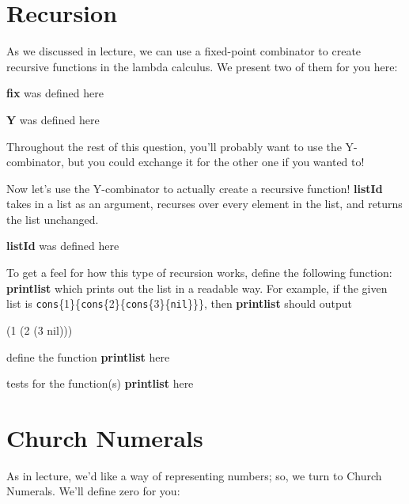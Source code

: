 \documentclass{article}
\newcommand{\op}[1]{\textbf{#1}}
\newcommand{\begintodo}[1]{\begin{center}define the function \op{#1} here\end{center}}
\newcommand{\begindone}[1]{\begin{center}\op{#1} was defined here\end{center}}
\newcommand{\finishtodo}[1]{}
\newcommand{\finishdone}[1]{}
\newcommand{\test}[2]{#1 = #2\par}
\newcommand{\begintests}[1]{\begin{center}tests for the function(s) \op{#1} here\\}
\newcommand{\finishtests}[1]{\end{center}}
\renewcommand{\c}[2]{\texttt{cons}\{#1\}\{#2\}}
\begin{document}
\section{Recursion}
As we discussed in lecture, we can use a fixed-point combinator to create recursive
functions in the lambda calculus.  We present two of them for you here:

\begindone{fix}
\newcommand{\fixer}[3]{#2{#1{#1}{#2}}{#3}}
\newcommand{\om}[1]{#1{#1}}
\newcommand{\fix}{\om{\fixer}}
\finishdone{fix}

\begindone{Y}
\newcommand{\dupPrint}{\ensuremath{\lambda f. \lambda x . f (x x)}}
\newcommand{\dup}[2]{#1 {#2{#2}}}
\newcommand{\Y}[1]{\dup{#1}{\dup{#1}}}
\finishdone{Y}

Throughout the rest of this question, you'll probably want to use the Y-combinator,
but you could exchange it for the other one if you wanted to!

Now let's use the Y-combinator to actually create a recursive function!  \op{listId}
takes in a list as an argument, recurses over every element in the list, and returns
the list unchanged.

\begindone{listId}
\newcommand{\recListId}[2]{\ifthenelse{\isempty{#2}}{\nil}{\cons{\car{#2}}{#1{\cdr{#2}}}}}
\newcommand{\listId}[1]{\Y {\recListId} {#1}}
\finishdone{listId}


To get a feel for how this type of recursion works, define the following function:
\op{printlist} which prints out the list in a readable way.  For example, if the
given list is \c{1}{\c{2}{\c{3}{\texttt{nil}}}}, then \op{printlist} should output
\begin{center}
(1 (2 (3 nil)))
\end{center}

\begintodo{printlist}
\newcommand{\printlist}[1]{}
\finishtodo{printlist}

\begintests{printlist}
\newcommand{\lstA}{\cons{1}{\cons{2}{\cons{3}{\nil}}}}
\newcommand{\lstB}{\cons{1}{\cons{2}{\nil}}}
\newcommand{\lstC}{\cons{1}{\nil}}
\finishtests{printlist}

\section{Church Numerals}
As in lecture, we'd like a way of representing numbers; so, we turn to Church Numerals.  We'll
define zero for you:
\end{document}
